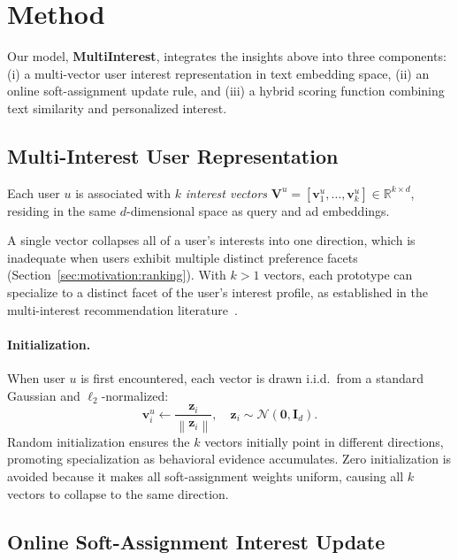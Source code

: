 \documentclass[10pt,twocolumn]{article}
\newcommand{\R}{\mathbb{R}}
\newcommand{\norm}[1]{\left\|#1\right\|}
\begin{document}
\section{Method}
\label{sec:method}

Our model, \textbf{MultiInterest}, integrates the insights above into
three components:
(i) a multi-vector user interest representation in text embedding space,
(ii) an online soft-assignment update rule,
and (iii) a hybrid scoring function combining text similarity and
personalized interest.

\subsection{Multi-Interest User Representation}
\label{sec:repr}

Each user $u$ is associated with $k$ \emph{interest vectors}
$\bm{V}^u = [\bm{v}^u_1, \ldots, \bm{v}^u_k] \in \R^{k \times d}$,
residing in the same $d$-dimensional space as query and ad embeddings.

A single vector collapses all of a user's interests into one direction,
which is inadequate when users exhibit multiple distinct preference
facets (Section~\ref{sec:motivation:ranking}).
With $k > 1$ vectors, each prototype can specialize to a distinct
facet of the user's interest profile, as established in the
multi-interest recommendation literature~\cite{li2019mind,cen2020comirec}.

\paragraph{Initialization.}
When user $u$ is first encountered, each vector is drawn i.i.d.\ from
a standard Gaussian and $\ell_2$-normalized:
\[
  \bm{v}^u_i \leftarrow \frac{\bm{z}_i}{\norm{\bm{z}_i}}, \quad
  \bm{z}_i \sim \mathcal{N}(\bm{0}, \bm{I}_d).
\]
Random initialization ensures the $k$ vectors initially point in
different directions, promoting specialization as behavioral evidence
accumulates.
Zero initialization is avoided because it makes all soft-assignment
weights uniform, causing all $k$ vectors to collapse to the same direction.

\subsection{Online Soft-Assignment Interest Update}
\label{sec:update}
\end{document}
